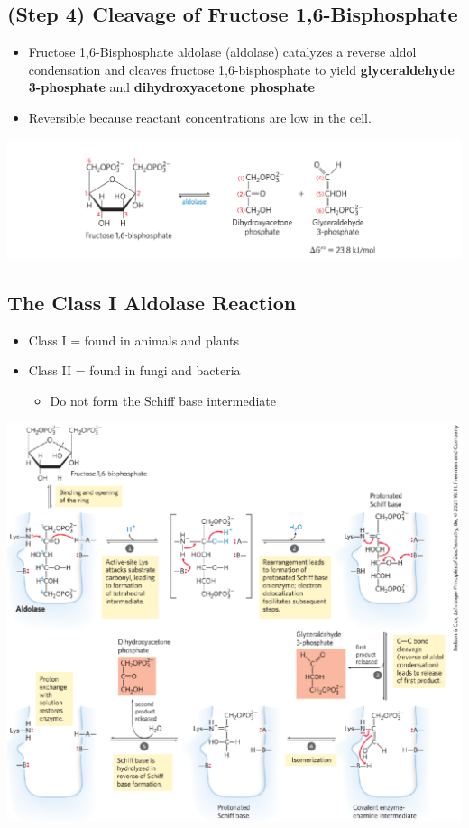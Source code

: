 \documentclass[10pt]{article}
\begin{document}
\subsection*{(Step 4) Cleavage of Fructose 1,6-Bisphosphate}
\begin{itemize}
	\item Fructose 1,6-Bisphosphate aldolase (aldolase) catalyzes a reverse aldol condensation and cleaves fructose 1,6-bisphosphate to yield \textbf{glyceraldehyde 3-phosphate} and \textbf{dihydroxyacetone phosphate}
	\item Reversible because reactant concentrations are low in the cell.
\end{itemize}

\begin{center} 
	\includegraphics*[width=\textwidth]{L1_8.png}
\end{center}

\subsection*{The Class I Aldolase Reaction}
\begin{itemize}
	\item Class I = found in animals and plants
	\item Class II = found in fungi and bacteria
	\begin{itemize}
        \item Do not form the Schiff base intermediate
    \end{itemize}
\end{itemize}
\begin{center} 
	\includegraphics*[width=\textwidth]{L1_9.png}
\end{center}
\end{document}
